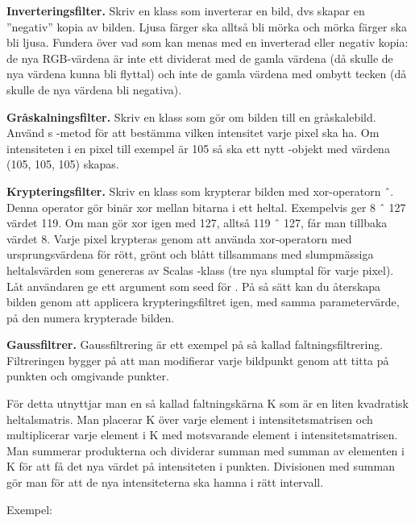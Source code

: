 \Task \textbf{Inverteringsfilter.} Skriv en klass  som inverterar en bild, dvs skapar en ''negativ'' kopia av bilden. Ljusa färger ska alltså bli mörka och mörka färger ska bli ljusa.
Fundera över vad som kan menas med en inverterad eller negativ kopia: de nya RGB-värdena är inte ett dividerat med de gamla värdena (då skulle de nya värdena kunna bli flyttal) och inte de gamla värdena med ombytt tecken (då skulle de nya värdena bli negativa).

\Task \textbf{Gråskalningsfilter.} Skriv en klass  som gör om bilden till en gråskalebild. Använd s -metod för att bestämma vilken intensitet varje pixel ska ha. Om intensiteten i en pixel till exempel är 105 så ska ett nytt -objekt med värdena (105, 105, 105) skapas.

\Task \textbf{Krypteringsfilter.} Skriv en klass  som krypterar bilden med xor-operatorn ˆ. Denna operator gör binär xor mellan bitarna i ett heltal. Exempelvis ger 8 ˆ 127 värdet 119. Om man gör xor igen med 127, alltså 119 ˆ 127, får man tillbaka värdet 8. Varje pixel krypteras genom att använda xor-operatorn med ursprungsvärdena för rött, grönt och blått tillsammans med slumpmässiga heltalsvärden som genereras av Scalas -klass (tre nya slumptal för varje pixel). Låt användaren ge ett argument som seed för . På så sätt kan du återskapa bilden genom att applicera krypteringsfiltret igen, med samma parametervärde, på den numera krypterade bilden.

\Task \textbf{Gaussfiltrer.} Gaussfiltrering är ett exempel på så kallad faltningsfiltrering. Filtreringen bygger på att man modifierar varje bildpunkt genom att titta på punkten och omgivande punkter.

För detta utnyttjar man en så kallad faltningskärna K som är en liten kvadratisk heltalsmatris. Man placerar K över varje element i intensitetsmatrisen och multiplicerar varje element i K med motsvarande element i intensitetsmatrisen. Man summerar produkterna och dividerar summan med summan av elementen i K för att få det nya värdet på intensiteten i punkten. Divisionen med summan gör man för att de nya intensiteterna ska hamna i rätt intervall.

Exempel:

